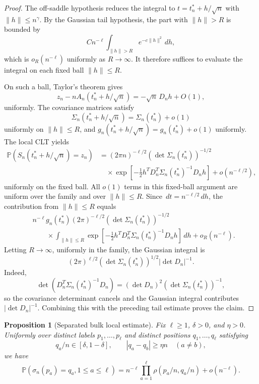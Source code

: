 \documentclass[11pt]{article}
\newtheorem{proposition}[theorem]{Proposition}
\theoremstyle{remark}
\newcommand{\Pp}{\mathbb P}
\newcommand{\dd}{\,d}
\begin{document}
\begin{proof}
The off-saddle hypothesis reduces the integral to \(t=t_n^*+h/\sqrt n\) with \(\|h\|\le n^\gamma\).  By the Gaussian tail hypothesis, the part with \(\|h\|>R\) is bounded by
\[
        C n^{-\ell}\int_{\|h\|>R}e^{-c\|h\|^2}\dd h,
\]
which is \(o_R(n^{-\ell})\) uniformly as \(R\to\infty\).  It therefore suffices to evaluate the integral on each fixed ball \(\|h\|\le R\).

On such a ball, Taylor's theorem gives
\[
        z_n-nA_n(t_n^*+h/\sqrt n)
        =-\sqrt n\,D_nh+O(1),
\]
uniformly.  The covariance matrices satisfy
\[
        \Sigma_n(t_n^*+h/\sqrt n)=\Sigma_n(t_n^*)+o(1)
\]
uniformly on \(\|h\|\le R\), and \(g_n(t_n^*+h/\sqrt n)=g_n(t_n^*)+o(1)\) uniformly.  The local CLT yields
\[
\begin{aligned}
        \Pp(S_n(t_n^*+h/\sqrt n)=z_n)
        &=(2\pi n)^{-\ell/2}(\det\Sigma_n(t_n^*))^{-1/2}  \\
        &\quad\times
        \exp\left[-\frac12 h^T D_n^T\Sigma_n(t_n^*)^{-1}D_nh\right]
        +o(n^{-\ell/2}),
\end{aligned}
\]
uniformly on the fixed ball.  All \(o(1)\) terms in this fixed-ball argument are uniform over the family and over \(\|h\|\le R\).  Since \(\dd t=n^{-\ell/2}\dd h\), the contribution from \(\|h\|\le R\) equals
\[
\begin{aligned}
        &n^{-\ell}g_n(t_n^*)(2\pi)^{-\ell/2}(\det\Sigma_n(t_n^*))^{-1/2} \\
        &\qquad\times
        \int_{\|h\|\le R}
        \exp\left[-\frac12 h^T D_n^T\Sigma_n(t_n^*)^{-1}D_nh\right]\dd h
        +o_R(n^{-\ell}).
\end{aligned}
\]
Letting \(R\to\infty\), uniformly in the family, the Gaussian integral is
\[
        (2\pi)^{\ell/2}(\det\Sigma_n(t_n^*))^{1/2}|\det D_n|^{-1}.
\]
Indeed,
\[
        \det(D_n^T\Sigma_n(t_n^*)^{-1}D_n)
        =(\det D_n)^2(\det\Sigma_n(t_n^*))^{-1},
\]
so the covariance determinant cancels and the Gaussian integral contributes \(|\det D_n|^{-1}\).  Combining this with the preceding tail estimate proves the claim.
\end{proof}

\begin{proposition}[Separated bulk local estimate]\label{prop:bulk-local-final}
Fix \(\ell\ge1\), \(\delta>0\), and \(\eta>0\).  Uniformly over distinct labels \(p_1,\ldots,p_\ell\) and distinct positions \(q_1,\ldots,q_\ell\) satisfying
\[
        q_a/n\in[\delta,1-\delta],
        \qquad |q_a-q_b|\ge \eta n\quad(a\ne b),
\]
we have
\[
        \Pp(\sigma_n(p_a)=q_a,1\le a\le\ell)
        =n^{-\ell}\prod_{a=1}^\ell
        \rho(p_a/n,q_a/n)+o(n^{-\ell}).
\]
\end{proposition}
\end{document}
